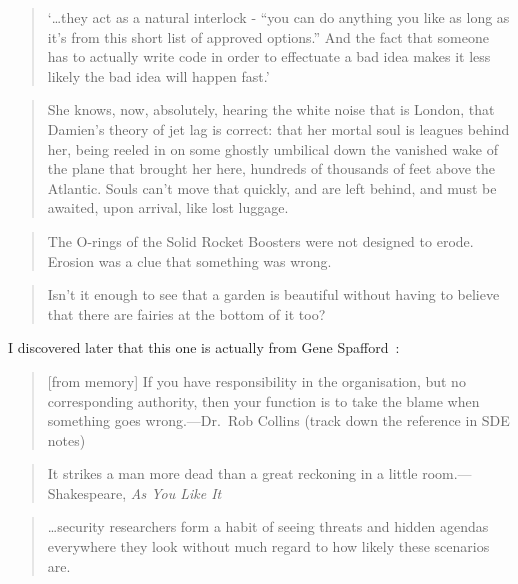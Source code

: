\documentclass[a4paper]{article}
\begin{document}
\medskip
\begin{quote}
	`\ldots they act as a natural interlock - ``you can do
	anything you like as long as it's from this short list of approved
	options.''  And the fact that someone has to actually write code in order
	to effectuate a bad idea makes it less likely the bad idea will happen
	fast.'~\cite{Ranum2008}
\end{quote}

\medskip
\begin{quote}
	She knows, now, absolutely, hearing the white noise that is London,
	that Damien's theory of jet lag is correct: that her mortal soul is
	leagues behind her, being reeled in on some ghostly umbilical down
	the vanished wake of the plane that brought her here, hundreds of
	thousands of feet above the Atlantic. Souls can't move that quickly,
	and are left behind, and must be awaited, upon arrival, like lost
	luggage.~\cite{Gibson2003}
\end{quote}

\medskip
\begin{quote}
	The O-rings of the Solid Rocket Boosters were not designed to erode.
	Erosion was a clue that something was wrong.~\cite{Feynman1986}
\end{quote}

\medskip
\begin{quote}
	Isn't it enough to see that a garden is beautiful without having
	to believe that there are fairies at the bottom of it too?~\cite{Adams1979}
\end{quote}

\medskip
I discovered later that this one is actually from Gene Spafford~\citep{Spafford2009}:
\begin{quote}
	[from memory] If you have responsibility in the organisation, but no
	corresponding authority, then your function is to take the blame
	when something goes wrong.---Dr.~Rob Collins (track down the
	reference in SDE notes)
\end{quote}

\medskip
\begin{quote}
	It strikes a man more dead than a great reckoning in a little
	room.---Shakespeare, \emph{As You Like It}
\end{quote}

\medskip
\begin{quote}
	\ldots security researchers form a habit of seeing threats and
	hidden agendas everywhere they look without much regard to how
	likely these scenarios are.~\cite{Aura2006}
\end{quote}
\end{document}
